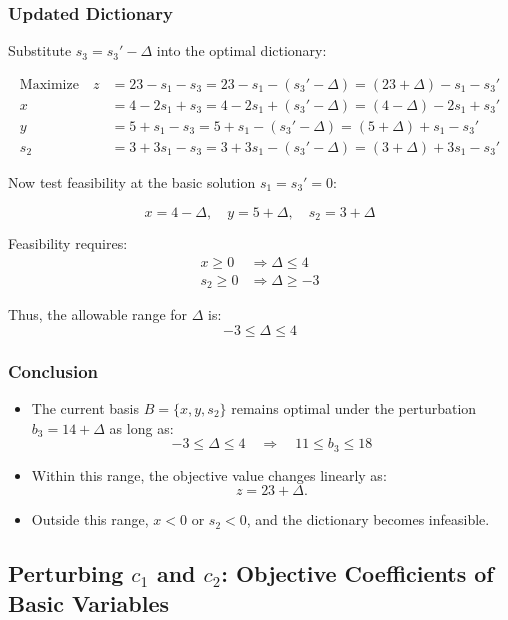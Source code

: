 \subsubsection*{Updated Dictionary}

Substitute \( s_3 = s_3' - \Delta \) into the optimal dictionary:

\[
\begin{aligned}
\text{Maximize} \quad 
z &= 23 - s_1 - s_3 = 23 - s_1 - (s_3' - \Delta) = (23 + \Delta) - s_1 - s_3' \\
x &= 4 - 2s_1 + s_3 = 4 - 2s_1 + (s_3' - \Delta) = (4 - \Delta) - 2s_1 + s_3' \\
y &= 5 + s_1 - s_3 = 5 + s_1 - (s_3' - \Delta) = (5 + \Delta) + s_1 - s_3' \\
s_2 &= 3 + 3s_1 - s_3 = 3 + 3s_1 - (s_3' - \Delta) = (3 + \Delta) + 3s_1 - s_3'
\end{aligned}
\]

Now test feasibility at the basic solution \( s_1 = s_3' = 0 \):

\[
x = 4 - \Delta, \quad
y = 5 + \Delta, \quad
s_2 = 3 + \Delta
\]

Feasibility requires:
\[
\begin{aligned}
x \geq 0 &\Rightarrow \Delta \leq 4 \\
s_2 \geq 0 &\Rightarrow \Delta \geq -3
\end{aligned}
\]

Thus, the allowable range for \( \Delta \) is:
\[
\boxed{-3 \leq \Delta \leq 4}
\]

\subsubsection*{Conclusion}

\begin{itemize}
\item The current basis \( B = \{x, y, s_2\} \) remains optimal under the perturbation \( b_3 = 14 + \Delta \) as long as:
\[
\boxed{-3 \leq \Delta \leq 4} \quad \Rightarrow \quad \boxed{11 \leq b_3 \leq 18}
\]
\item Within this range, the objective value changes linearly as:
\[
z = 23 + \Delta.
\]
\item Outside this range, \( x < 0 \) or \( s_2 < 0 \), and the dictionary becomes infeasible.
\end{itemize}



\subsection{Perturbing \( c_1 \) and \( c_2 \): Objective Coefficients of Basic Variables}

